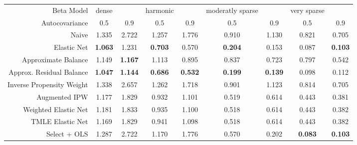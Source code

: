 \begin{table}[ht]
\centering
\begin{tabular}{|r|cc|cc|cc|cc|}
   \hline
Beta Model & dense &  & harmonic &  & moderatly sparse &  & very sparse &  \\ 
  Autocovariance & 0.5 & 0.9 & 0.5 & 0.9 & 0.5 & 0.9 & 0.5 & 0.9 \\ 
   \hline
Naive & 1.335 & 2.722 & 1.257 & 1.776 & 0.910 & 1.130 & 0.821 & 0.705 \\ 
  Elastic Net &  \bf 1.063 & 1.231 &  \bf 0.703 & 0.570 &  \bf 0.204 & 0.153 & 0.087 &  \bf 0.103 \\ 
   \hline
Approximate Balance & 1.149 &  \bf 1.167 & 1.113 & 0.895 & 0.837 & 0.723 & 0.797 & 0.542 \\ 
  Approx. Residual Balance &  \bf 1.047 &  \bf 1.144 &  \bf 0.686 &  \bf 0.532 &  \bf 0.199 &  \bf 0.139 & 0.098 & 0.112 \\ 
   \hline
Inverse Propensity Weight & 1.338 & 2.657 & 1.262 & 1.718 & 0.901 & 1.123 & 0.814 & 0.705 \\ 
  Augmented IPW & 1.177 & 1.829 & 0.932 & 1.101 & 0.519 & 0.614 & 0.443 & 0.381 \\ 
   \hline
Weighted Elastic Net & 1.181 & 1.833 & 0.935 & 1.100 & 0.518 & 0.614 & 0.443 & 0.382 \\ 
  TMLE Elastic Net & 1.169 & 1.829 & 0.941 & 1.098 & 0.518 & 0.614 & 0.443 & 0.382 \\ 
   \hline
Select + OLS & 1.287 & 2.722 & 1.170 & 1.776 & 0.570 & 0.202 &  \bf 0.083 &  \bf 0.103 \\ 
   \hline
\end{tabular}
\end{table}
